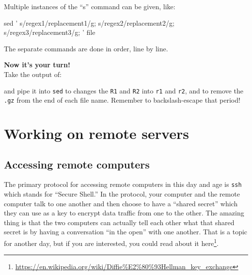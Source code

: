 \documentclass[]{krantz}
\makeatletter
\newenvironment{Shaded}{\begin{snugshade}}{\end{snugshade}}
\newcommand{\BuiltInTok}[1]{#1}
\newcommand{\ExtensionTok}[1]{#1}
\newcommand{\FunctionTok}[1]{\textcolor[rgb]{0,0,0}{#1}}
\newcommand{\KeywordTok}[1]{\textcolor[rgb]{0.27,0.27,0.27}{\textbf{#1}}}
\newcommand{\NormalTok}[1]{#1}
\newcommand{\StringTok}[1]{\textcolor[rgb]{0.5,0.5,0.5}{#1}}
\newcommand{\VariableTok}[1]{\textcolor[rgb]{0,0,0}{#1}}
\renewcommand{\href}[2]{#2\footnote{\url{#1}}}
\newenvironment{kframe}{%
\medskip{}
\setlength{\fboxsep}{.8em}
 \def\at@end@of@kframe{}%
 \ifinner\ifhmode%
  \def\at@end@of@kframe{\end{minipage}}%
  \begin{minipage}{\columnwidth}%
 \fi\fi%
 \def\FrameCommand##1{\hskip\@totalleftmargin \hskip-\fboxsep
 \colorbox{shadecolor}{##1}\hskip-\fboxsep
     \hskip-\linewidth \hskip-\@totalleftmargin \hskip\columnwidth}%
 \MakeFramed {\advance\hsize-\width
   \@totalleftmargin\z@ \linewidth\hsize
   \@setminipage}}%
 {\par\unskip\endMakeFramed%
 \at@end@of@kframe}
\renewenvironment{Shaded}{\begin{kframe}}{\end{kframe}}
\makeatother
\begin{document}
Multiple instances of the ``s'' command can be given, like:

\begin{Shaded}
\begin{Highlighting}[]
\FunctionTok{sed} \StringTok{'}
\StringTok{  s/regex1/replacement1/g;}
\StringTok{  s/regex2/replacement2/g;}
\StringTok{  s/regex3/replacement3/g;}
\StringTok{'}\NormalTok{ file}
\end{Highlighting}
\end{Shaded}

The separate commands are done in order, line by line.

\textbf{Now it's your turn!}\\
Take the output of:

\begin{Shaded}
\end{Shaded}

and pipe it into \texttt{sed} to changes the \texttt{R1} and \texttt{R2} into \texttt{r1} and \texttt{r2},
and to remove the \texttt{.gz} from the end of each file name. Remember to
backslash-escape that period!

\hypertarget{working-on-remote-servers}{%
\chapter{Working on remote servers}\label{working-on-remote-servers}}

\hypertarget{accessing-remote-computers}{%
\section{Accessing remote computers}\label{accessing-remote-computers}}

The primary protocol for accessing remote computers in this day and age
is \texttt{ssh} which stands for ``Secure Shell.'' In the protocol, your computer
and the remote computer talk to one another and then choose to have a ``shared
secret'' which they can use as a key to encrypt data traffic from one to the other.
The amazing thing is that the two computers can actually tell each other what
that shared secret is by having a conversation ``in the open'' with one another.
That is a topic for another day, but if you are interested, you could
read about it \href{https://en.wikipedia.org/wiki/Diffie\%E2\%80\%93Hellman_key_exchange}{here}.
\end{document}
